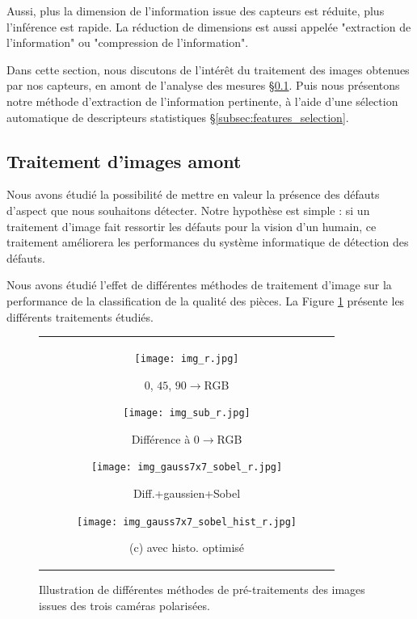 Aussi, plus la dimension de l'information issue des capteurs est réduite, plus l'inférence est rapide.
La réduction de dimensions est aussi appelée "extraction de l'information" ou "compression de l'information".


Dans cette section, nous discutons de l'intérêt du traitement des images obtenues par nos capteurs, en amont de l'analyse des mesures §\ref{subsec:image_preprocessing}.
Puis nous présentons notre méthode d'extraction de l'information pertinente, à l'aide d'une sélection automatique de descripteurs statistiques §\ref{subsec:features_selection}.

\subsection{Traitement d'images amont} \label{subsec:image_preprocessing}
Nous avons étudié la possibilité de mettre en valeur la présence des défauts d'aspect que nous souhaitons détecter.
Notre hypothèse est simple : si un traitement d'image fait ressortir les défauts pour la vision d'un humain, ce traitement améliorera les performances du système informatique de détection des défauts.

Nous avons étudié l'effet de différentes méthodes de traitement d'image sur la performance de la classification de la qualité des pièces.
La Figure \ref{fig:preprocessing} présente les différents traitements étudiés.

\begin{figure}[tbhp]
	\begin{center}
		\begin{tabular}{c}
			\begin{subfigure}[b]{0.245\linewidth}
				\texttt{[image: img\_r.jpg]}
				\caption{$0$\degree, $45$\degree, $90$\degree$\rightarrow$RGB}
			\end{subfigure}
			\begin{subfigure}[b]{0.245\linewidth}
				\texttt{[image: img\_sub\_r.jpg]}
				\caption{Différence à $0$\degree$\rightarrow$RGB}
			\end{subfigure}
			\begin{subfigure}[b]{0.245\linewidth}
				\texttt{[image: img\_gauss7x7\_sobel\_r.jpg]}
				\caption{Diff.+gaussien+Sobel}
			\end{subfigure}
			\begin{subfigure}[b]{0.245\linewidth}
				\texttt{[image: img\_gauss7x7\_sobel\_hist\_r.jpg]}
				\caption{(c) avec histo. optimisé}
			\end{subfigure}
		\end{tabular}
	\end{center}
	\caption{Illustration de différentes méthodes de pré-traitements des images issues des trois caméras polarisées.}
	\label{fig:preprocessing}
\end{figure}

